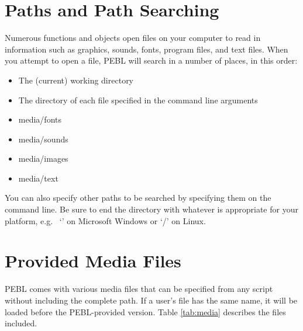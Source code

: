 \section{Paths and Path Searching}

Numerous functions and objects open files on your computer to read in
information such as graphics, sounds, fonts, program files, and text files.  When you attempt to open a file, PEBL will search in a number of places, 
in this order:
\begin{itemize}
\item
The (current) working directory
\item
The directory of each file specified in the command line arguments
\item
media/fonts
\item
media/sounds
\item
media/images
\item
media/text
\end{itemize}
  
You can also specify other paths to be searched by specifying them on the command line.  Be sure to end the directory with whatever is appropriate for your platform, e.g.~ `' on Microsoft Windows or `/' on Linux.

\section{Provided Media Files}

PEBL comes with various media files that can be specified from 
any script without including the complete path.  If a user's file has
the same name, it will be loaded before the PEBL-provided version.
Table \ref{tab:media} describes the files included.
\vspace{1cm}

